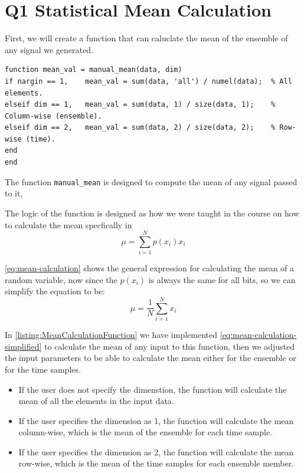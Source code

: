 \chapter[Q1 Statistical Mean Calculation]{Q1 Statistical Mean Calculation}
\label{cp:q1-statistical-mean-calculation}

First, we will create a function that can caluclate the mean of the ensemble of
any signal we generated.

\begin{listing} [!htpb]
    \caption{Manual Mean Calculation Function.}
    \label{listing:MeanCalculationFunction}
    \begin{verbatim}
function mean_val = manual_mean(data, dim)
if nargin == 1,    mean_val = sum(data, 'all') / numel(data);  % All elements.
elseif dim == 1,   mean_val = sum(data, 1) / size(data, 1);    % Column-wise (ensemble).
elseif dim == 2,   mean_val = sum(data, 2) / size(data, 2);    % Row-wise (time).
end
end
    \end{verbatim}
\end{listing}

The function \texttt{manual\_mean} is designed to compute the mean of any
signal passed to it,

The logic of the function is designed as how we were taught in the course on
how to calculate the mean specfically in \cite{Nafie2026a}
\begin{equation}
    \mu = \sum_{i=1}^{N} p(x_i) x_i
    \label{eq:mean-calculation}
\end{equation}

\autoref{eq:mean-calculation} shows the general expression for calculating the mean of a random variable,
now since the $p(x_i)$ is always the same for all bits, so we can simplify the equation to be:
\begin{equation}
    \mu = \frac{1}{N} \sum_{i=1}^{N} x_i
    \label{eq:mean-calculation-simplified}
\end{equation}

In \autoref{listing:MeanCalculationFunction} we have implemented
\autoref{eq:mean-calculation-simplified} to calculate the mean of any input to
this function, then we adjusted the input parameters to be able to calculate
the mean either for the ensemble or for the time samples.

\begin{itemize}
    \item If the user does not specify the dimenstion, the function will calculate the
          mean of all the elements in the input data.
    \item If the user specifies the dimension as 1, the function will calculate the mean
          column-wise, which is the mean of the ensemble for each time sample.
    \item If the user specifies the dimension as 2, the function will calculate the mean
          row-wise, which is the mean of the time samples for each ensemble member.
\end{itemize}

